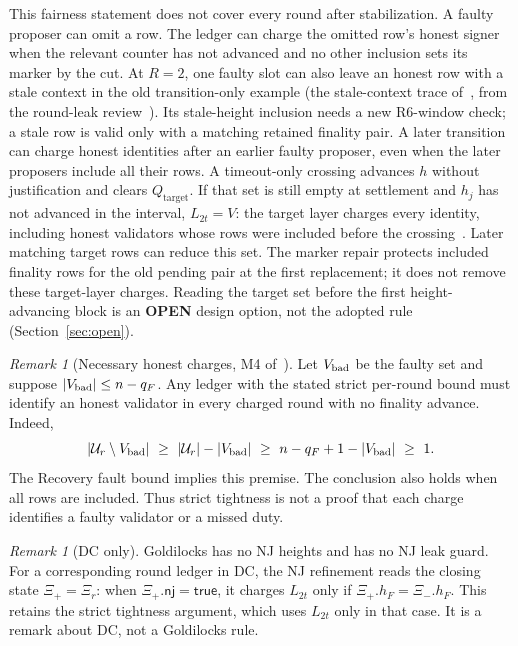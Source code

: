 \documentclass{article}
\theoremstyle{plain}
\theoremstyle{definition}
\theoremstyle{remark}
\newtheorem{remark}[theorem]{Remark}
\newcommand{\Qtarget}{Q_{\mathrm{target}}}
\newcommand{\nj}{\mathsf{nj}}
\newcommand{\OPEN}{\textbf{OPEN}}
\begin{document}
This fairness statement does not cover every round after stabilization.
A faulty proposer can omit a row.  The ledger can charge the omitted row's
honest signer when the relevant counter has not advanced and no other
inclusion sets its marker by the cut.  At $R=2$, one faulty slot can also
leave an honest row with a stale context in the old transition-only
example (the stale-context trace of~\cite[\S6, M2]{LS183},
from the round-leak review~\cite{RLR}).  Its stale-height inclusion
needs a new R6-window check; a stale row is valid only with a matching
retained finality pair.
A later transition can charge honest identities after an earlier faulty
proposer, even when the later proposers include all their rows.
A timeout-only crossing advances $h$ without justification and clears
$\Qtarget$.  If that set is still empty at settlement and $h_j$ has
not advanced in the interval, $L_{2t}=V$: the target layer charges every
identity, including honest validators whose rows were included before
the crossing~\cite[\S3.2]{RL179}.  Later matching target rows can
reduce this set.  The marker repair protects included finality rows
for the old pending pair at the first replacement; it does not remove
these target-layer charges.  Reading the target set before the first
height-advancing block is an \OPEN{} design option, not the adopted
rule (Section~\ref{sec:open}).

\begin{remark}[Necessary honest charges, M4 of~\cite{RLR,LS183}]
Let $V_{\rm bad}$ be the faulty set and suppose
$|V_{\rm bad}|\leq n-q_F$.  Any ledger with the stated strict per-round
bound must identify an honest validator in every charged round with
no finality advance.  Indeed,
\[
 |\mathcal U_r\setminus V_{\rm bad}|
 \ \geq\ |\mathcal U_r|-|V_{\rm bad}|
 \ \geq\ n-q_F+1-|V_{\rm bad}|\ \geq\ 1.
\]
The Recovery fault bound implies this premise.  The conclusion also
holds when all rows are included.  Thus strict tightness is not a
proof that each charge identifies a faulty validator or a missed duty.
\end{remark}

\begin{remark}[DC only]
Goldilocks has no NJ heights and has no NJ leak guard.  For a corresponding
round ledger in DC, the NJ refinement reads the closing state
$\Xi_+=\Xi_r$: when $\Xi_+.\nj=\mathsf{true}$, it charges $L_{2t}$ only if
$\Xi_+.h_F=\Xi_-.h_F$.  This retains the strict tightness
argument, which uses $L_{2t}$ only in that case.  It is a remark about
DC, not a Goldilocks rule.
\end{remark}
\end{document}

